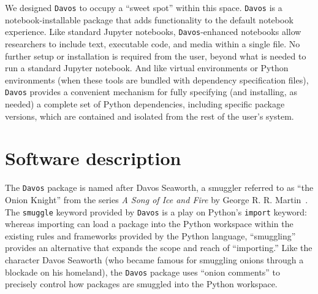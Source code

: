 \documentclass[preprint,12pt,a4paper]{elsarticle}
\begin{document}
We designed \texttt{Davos} to occupy a ``sweet spot'' within this space.
\texttt{Davos} is a notebook-installable package that adds functionality to the
default notebook experience. Like standard Jupyter notebooks,
\texttt{Davos}-enhanced notebooks allow researchers to include text, executable
code, and media within a single file. No further setup or installation is
required from the user, beyond what is needed to run a standard Jupyter
notebook. And like virtual environments or Python environments (when these
tools are bundled with dependency specification files), \texttt{Davos} provides
a convenient mechanism for fully specifying (and installing, as needed) a
complete set of Python dependencies, including specific package versions, which
are contained and isolated from the rest of the user's system.


\section{Software description}

The \texttt{Davos} package is named after Davos Seaworth, a smuggler referred
to as ``the Onion Knight'' from the series \textit{A Song of Ice and Fire} by
George R. R. Martin~\cite{Mart98}. The \texttt{smuggle} keyword provided by
\texttt{Davos} is a play on Python's \texttt{import} keyword: whereas importing
can load a package into the Python workspace within the existing rules and
frameworks provided by the Python language, ``smuggling'' provides an
alternative that expands the scope and reach of ``importing.'' Like the
character Davos Seaworth (who became famous for smuggling onions through a
blockade on his homeland), the \texttt{Davos} package uses ``onion comments'' to precisely control how
packages are smuggled into the Python workspace.
\end{document}
